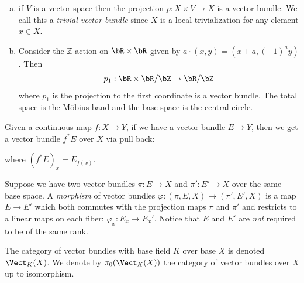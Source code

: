 \documentclass[11pt, raggedright]{tufte-book}
\begin{document}
\begin{example}\label{ex:vector-bundles}$ $
  \begin{enumerate}[(a)]
    \item if $V$ is a vector space then the projection $p:X\times V\to X$ is a vector bundle. We call this a \emph{trivial vector bundle} since $X$ is a local trivialization for any element $x\in X$.
    \item Consider the $\mathbb Z$ action on $\bR \times \bR$ given by $a\cdot (x,y) = (x + a, (-1)^ay)$. Then
    \begin{align*}
      p_1:\bR\times \bR/\bZ \to \bR/\bZ
    \end{align*}
    where $p_1$ is the projection to the first coordinate is a vector bundle. The total space is the M\"obius band and the base space is the central circle.
  \end{enumerate}
\end{example}
\begin{defn}\label{defn:pullback-square}
  Given a continuous map $f:X\to Y$, if we have a vector bundle $E\to Y$, then we get a vector bundle $f^*E$ over $X$ via pull back:
  \begin{center}
  \end{center}
  where $(f^*E)_x = E_{f(x)}$.
\end{defn}
\begin{defn}\label{defn:}
  Suppose we have two vector bundles $\pi:E\to X$ and $\pi':E'\to X$ over the same base space. A \emph{morphism} of vector bundles $\varphi:(\pi,E,X)\to (\pi',E',X)$ is a map $E\to E'$ which both commutes with the projection maps $\pi$ and $\pi'$ and restricts to a linear maps on each fiber: $\varphi_x: E_x\to E_x'$. Notice that $E$ and $E'$ are \emph{not} required to be of the same rank.
\end{defn}


\begin{defn}\label{defn:isomorphism-classes-of-vector-bundles}
  The category of vector bundles with base field $K$ over base $X$ is denoted $\Vect_K(X)$. We denote by $\pi_0(\Vect_K(X))$ the category of vector bundles over $X$ up to isomorphism.
\end{defn}
\end{document}
